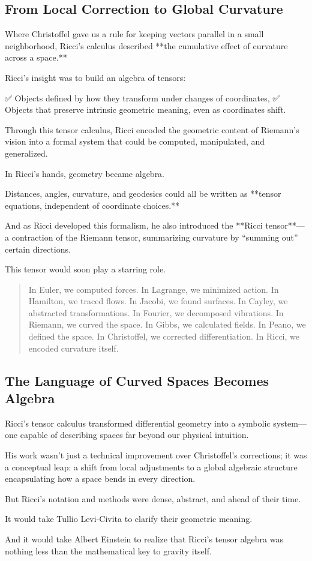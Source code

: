 \bigskip

\subsection*{From Local Correction to Global Curvature}

Where Christoffel gave us a rule for keeping vectors parallel in a small neighborhood,  
Ricci’s calculus described **the cumulative effect of curvature across a space.**

Ricci’s insight was to build an algebra of tensors:

✅ Objects defined by how they transform under changes of coordinates,  
✅ Objects that preserve intrinsic geometric meaning, even as coordinates shift.

Through this tensor calculus, Ricci encoded the geometric content of Riemann’s vision into a formal system that could be computed, manipulated, and generalized.

\bigskip

In Ricci’s hands, geometry became algebra.

Distances, angles, curvature, and geodesics could all be written as **tensor equations, independent of coordinate choices.**

And as Ricci developed this formalism, he also introduced the **Ricci tensor**—a contraction of the Riemann tensor, summarizing curvature by “summing out” certain directions.

This tensor would soon play a starring role.

\bigskip

\begin{quote}
In Euler, we computed forces.  
In Lagrange, we minimized action.  
In Hamilton, we traced flows.  
In Jacobi, we found surfaces.  
In Cayley, we abstracted transformations.  
In Fourier, we decomposed vibrations.  
In Riemann, we curved the space.  
In Gibbs, we calculated fields.  
In Peano, we defined the space.  
In Christoffel, we corrected differentiation.  
In Ricci, we encoded curvature itself.
\end{quote}

\subsection*{The Language of Curved Spaces Becomes Algebra}

Ricci’s tensor calculus transformed differential geometry into a symbolic system—  
one capable of describing spaces far beyond our physical intuition.

His work wasn’t just a technical improvement over Christoffel’s corrections;  
it was a conceptual leap:  
a shift from local adjustments to a global algebraic structure encapsulating how a space bends in every direction.

But Ricci’s notation and methods were dense, abstract, and ahead of their time.

It would take Tullio Levi-Civita to clarify their geometric meaning.

And it would take Albert Einstein to realize that Ricci’s tensor algebra was nothing less than the mathematical key to gravity itself.


